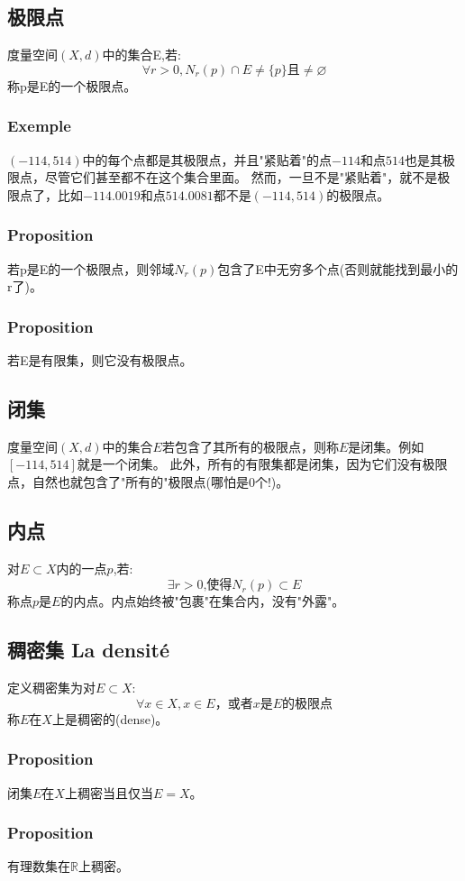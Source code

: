 \documentclass[12pt, a4paper, oneside]{ctexbook}
\begin{document}
  \subsection{极限点}
  度量空间$(X,d)$中的集合E,若:
  $$
  \forall r>0, N_r(p)\cap E\neq\{p\}\mbox{且}\neq\varnothing 
  $$
  称p是E的一个极限点。
  \subsubsection{Exemple}
  $(-114,514)$中的每个点都是其极限点，并且"紧贴着"的点$-114$和点$514$也是其极限点，尽管它们甚至都不在这个集合里面。
  然而，一旦不是"紧贴着"，就不是极限点了，比如$-114.0019$和点$514.0081$都不是$(-114,514)$的极限点。
  \subsubsection{Proposition}
  若p是E的一个极限点，则邻域$N_r(p)$包含了E中无穷多个点(否则就能找到最小的r了)。
  \subsubsection{Proposition}
  若E是有限集，则它没有极限点。
  \subsection{闭集}
  度量空间$(X,d)$中的集合$E$若包含了其所有的极限点，则称$E$是闭集。例如$[-114,514]$就是一个闭集。
  此外，所有的有限集都是闭集，因为它们没有极限点，自然也就包含了"所有的"极限点(哪怕是0个!)。
  \subsection{内点}
  对$E\subset X$内的一点$p$,若:
  $$
    \exists r>0\mbox{,使得}N_r(p)\subset E
  $$称点$p$是$E$的内点。内点始终被"包裹"在集合内，没有"外露"。

  \subsection{稠密集 La densité}
  定义稠密集为对$E\subset X$:
  $$
  \forall x\in X, x\in E\text{，或者}x{是}E{的极限点}
  $$
  称$E$在$X$上是稠密的(dense)。
  \subsubsection{Proposition}
  闭集$E$在$X$上稠密当且仅当$E=X$。
  \subsubsection{Proposition}
  有理数集在$\mathbb{R}$上稠密。
\end{document}
